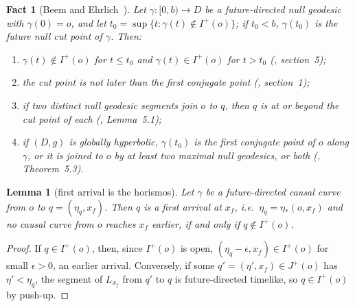 \documentclass[aip,jmp,amsmath,amssymb,reprint]{revtex4-2}
\theoremstyle{plain}
\newtheorem{lemma}[proposition]{Lemma}
\newtheorem{fact}[proposition]{Fact}
\theoremstyle{definition}
\begin{document}
\begin{fact}[Beem and Ehrlich~\cite{BeemEhrlich1979GRG,BeemEhrlich1979MPCPS}]
\label{fact:cut}
Let $\gamma:[0,b)\to D$ be a future-directed null geodesic with $\gamma(0)=o$, and let
$t_0=\sup\{t:\gamma(t)\notin I^+(o)\}$; if $t_0<b$, $\gamma(t_0)$ is the \emph{future null
cut point} of $\gamma$. Then:
\begin{enumerate}
\item $\gamma(t)\notin I^+(o)$ for $t\le t_0$ and $\gamma(t)\in I^+(o)$ for $t>t_0$
  (\cite{BeemEhrlich1979GRG}, section~5);
\item the cut point is not later than the first conjugate point
  (\cite{BeemEhrlich1979MPCPS}, section~1);
\item if two distinct null geodesic segments join $o$ to $q$, then $q$ is at or beyond the
  cut point of each (\cite{BeemEhrlich1979GRG}, Lemma~5.1);
\item if $(D,g)$ is globally hyperbolic, $\gamma(t_0)$ is the first conjugate point of
  $o$ along $\gamma$, or it is joined to $o$ by at least two maximal null geodesics, or
  both (\cite{BeemEhrlich1979GRG}, Theorem~5.3).
\end{enumerate}
\end{fact}

\begin{lemma}[first arrival is the horismos]\label{lem:horismos}
Let $\gamma$ be a future-directed causal curve from $o$ to $q=(\eta_q,x_f)$. Then $q$ is a
first arrival at $x_f$, i.e.\ $\eta_q=\eta_*(o,x_f)$ and no causal curve from $o$ reaches
$x_f$ earlier, if and only if $q\notin I^+(o)$.
\end{lemma}

\begin{proof}
If $q\in I^+(o)$, then, since $I^+(o)$ is open, $(\eta_q-\epsilon,x_f)\in I^+(o)$ for
small $\epsilon>0$, an earlier arrival. Conversely, if some $q'=(\eta',x_f)\in J^+(o)$ has
$\eta'<\eta_q$, the segment of $L_{x_f}$ from $q'$ to $q$ is future-directed timelike, so
$q\in I^+(o)$ by push-up.
\end{proof}
\end{document}
